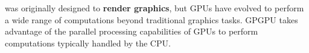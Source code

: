 \highspace\label{def: General-Purpose computing on Graphics Processing Units (GPGPU)}
 was originally designed to \textbf{render graphics}, but GPUs have evolved to perform a wide range of computations beyond traditional graphics tasks. GPGPU takes advantage of the parallel processing capabilities of GPUs to perform computations typically handled by the CPU.